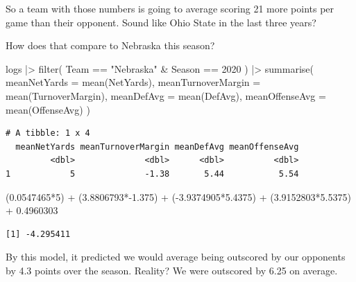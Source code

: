 \documentclass[
  letterpaper,
  DIV=11,
  numbers=noendperiod]{scrreprt}
\newenvironment{Shaded}{\begin{snugshade}}{\end{snugshade}}
\newcommand{\AttributeTok}[1]{\textcolor[rgb]{0.40,0.45,0.13}{#1}}
\newcommand{\DecValTok}[1]{\textcolor[rgb]{0.68,0.00,0.00}{#1}}
\newcommand{\FloatTok}[1]{\textcolor[rgb]{0.68,0.00,0.00}{#1}}
\newcommand{\FunctionTok}[1]{\textcolor[rgb]{0.28,0.35,0.67}{#1}}
\newcommand{\NormalTok}[1]{\textcolor[rgb]{0.00,0.23,0.31}{#1}}
\newcommand{\SpecialCharTok}[1]{\textcolor[rgb]{0.37,0.37,0.37}{#1}}
\newcommand{\StringTok}[1]{\textcolor[rgb]{0.13,0.47,0.30}{#1}}
\begin{document}
So a team with those numbers is going to average scoring 21 more points
per game than their opponent. Sound like Ohio State in the last three
years?

How does that compare to Nebraska this season?

\begin{Shaded}
\begin{Highlighting}[]
\NormalTok{logs }\SpecialCharTok{|\textgreater{}} 
  \FunctionTok{filter}\NormalTok{(}
\NormalTok{    Team }\SpecialCharTok{==} \StringTok{"Nebraska"} \SpecialCharTok{\&}\NormalTok{ Season }\SpecialCharTok{==} \DecValTok{2020}
\NormalTok{    ) }\SpecialCharTok{|\textgreater{}} 
  \FunctionTok{summarise}\NormalTok{(}
    \AttributeTok{meanNetYards =} \FunctionTok{mean}\NormalTok{(NetYards),}
    \AttributeTok{meanTurnoverMargin =} \FunctionTok{mean}\NormalTok{(TurnoverMargin),}
    \AttributeTok{meanDefAvg =} \FunctionTok{mean}\NormalTok{(DefAvg),}
    \AttributeTok{meanOffenseAvg =} \FunctionTok{mean}\NormalTok{(OffenseAvg)}
\NormalTok{  )}
\end{Highlighting}
\end{Shaded}

\begin{verbatim}
# A tibble: 1 x 4
  meanNetYards meanTurnoverMargin meanDefAvg meanOffenseAvg
         <dbl>              <dbl>      <dbl>          <dbl>
1            5              -1.38       5.44           5.54
\end{verbatim}

\begin{Shaded}
\begin{Highlighting}[]
\NormalTok{(}\FloatTok{0.0547465}\SpecialCharTok{*}\DecValTok{5}\NormalTok{) }\SpecialCharTok{+}\NormalTok{ (}\FloatTok{3.8806793}\SpecialCharTok{*{-}}\FloatTok{1.375}\NormalTok{) }\SpecialCharTok{+}\NormalTok{ (}\SpecialCharTok{{-}}\FloatTok{3.9374905}\SpecialCharTok{*}\FloatTok{5.4375}\NormalTok{) }\SpecialCharTok{+}\NormalTok{ (}\FloatTok{3.9152803}\SpecialCharTok{*}\FloatTok{5.5375}\NormalTok{) }\SpecialCharTok{+} \FloatTok{0.4960303}
\end{Highlighting}
\end{Shaded}

\begin{verbatim}
[1] -4.295411
\end{verbatim}

By this model, it predicted we would average being outscored by our
opponents by 4.3 points over the season. Reality? We were outscored by
6.25 on average.
\end{document}

